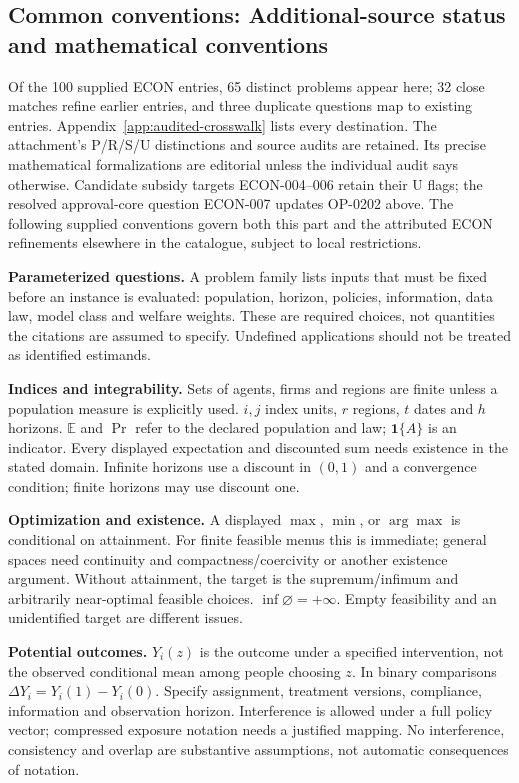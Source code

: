 \documentclass[11pt,a4paper]{article}
\begin{document}
\subsection*{Common conventions: Additional-source status and mathematical conventions}

\label{audited:conventions}

Of the 100 supplied ECON entries, 65 distinct problems appear here; 32 close
matches refine earlier entries, and three duplicate questions map to existing
entries. Appendix~\ref{app:audited-crosswalk} lists every destination.
The attachment's P/R/S/U distinctions and source audits are retained. Its
precise mathematical formalizations are editorial unless the individual audit
says otherwise. Candidate subsidy targets ECON-004--006 retain their U flags;
the resolved approval-core question ECON-007 updates OP-0202 above.
The following supplied conventions govern both this part and the attributed
ECON refinements elsewhere in the catalogue, subject to local restrictions.

\textbf{Parameterized questions.} A problem family lists inputs that must be fixed before an instance is evaluated: population, horizon, policies, information, data law, model class and welfare weights. These are required choices, not quantities the citations are assumed to specify. Undefined applications should not be treated as identified estimands.

\textbf{Indices and integrability.} Sets of agents, firms and regions are finite unless a population measure is explicitly used. \(i,j\) index units, \(r\) regions, \(t\) dates and \(h\) horizons. \(\mathbb E\) and \(\Pr\) refer to the declared population and law; \(\mathbf1\{A\}\) is an indicator. Every displayed expectation and discounted sum needs existence in the stated domain. Infinite horizons use a discount in \((0,1)\) and a convergence condition; finite horizons may use discount one.

\textbf{Optimization and existence.} A displayed \(\max\), \(\min\), or \(\arg\max\) is conditional on attainment. For finite feasible menus this is immediate; general spaces need continuity and compactness/coercivity or another existence argument. Without attainment, the target is the supremum/infimum and arbitrarily near-optimal feasible choices. \(\inf\varnothing=+\infty\). Empty feasibility and an unidentified target are different issues.

\textbf{Potential outcomes.} \(Y_i(z)\) is the outcome under a specified intervention, not the observed conditional mean among people choosing \(z\). In binary comparisons \(\Delta Y_i=Y_i(1)-Y_i(0)\). Specify assignment, treatment versions, compliance, information and observation horizon. Interference is allowed under a full policy vector; compressed exposure notation needs a justified mapping. No interference, consistency and overlap are substantive assumptions, not automatic consequences of notation.
\end{document}
